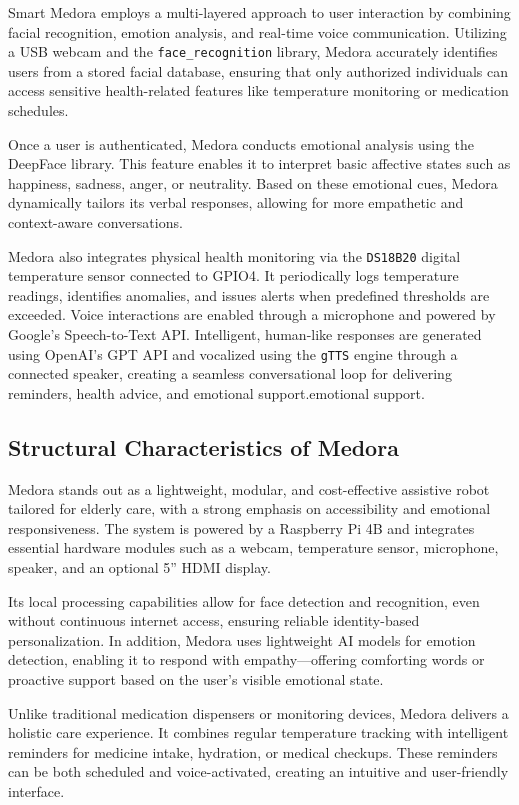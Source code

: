 Smart Medora employs a multi-layered approach to user interaction by combining facial recognition, emotion analysis, and real-time voice communication. Utilizing a USB webcam and the \texttt{face\_recognition} library, Medora accurately identifies users from a stored facial database, ensuring that only authorized individuals can access sensitive health-related features like temperature monitoring or medication schedules.

Once a user is authenticated, Medora conducts emotional analysis using the DeepFace library. This feature enables it to interpret basic affective states such as happiness, sadness, anger, or neutrality. Based on these emotional cues, Medora dynamically tailors its verbal responses, allowing for more empathetic and context-aware conversations.

Medora also integrates physical health monitoring via the \texttt{DS18B20} digital temperature sensor connected to GPIO4. It periodically logs temperature readings, identifies anomalies, and issues alerts when predefined thresholds are exceeded. Voice interactions are enabled through a microphone and powered by Google's Speech-to-Text API. Intelligent, human-like responses are generated using OpenAI’s GPT API and vocalized using the \texttt{gTTS} engine through a connected speaker, creating a seamless conversational loop for delivering reminders, health advice, and emotional support.emotional support.

\subsection{Structural Characteristics of Medora}


Medora stands out as a lightweight, modular, and cost-effective assistive robot tailored for elderly care, with a strong emphasis on accessibility and emotional responsiveness. The system is powered by a Raspberry Pi 4B and integrates essential hardware modules such as a webcam, temperature sensor, microphone, speaker, and an optional 5” HDMI display.

Its local processing capabilities allow for face detection and recognition, even without continuous internet access, ensuring reliable identity-based personalization. In addition, Medora uses lightweight AI models for emotion detection, enabling it to respond with empathy—offering comforting words or proactive support based on the user's visible emotional state.

Unlike traditional medication dispensers or monitoring devices, Medora delivers a holistic care experience. It combines regular temperature tracking with intelligent reminders for medicine intake, hydration, or medical checkups. These reminders can be both scheduled and voice-activated, creating an intuitive and user-friendly interface.

